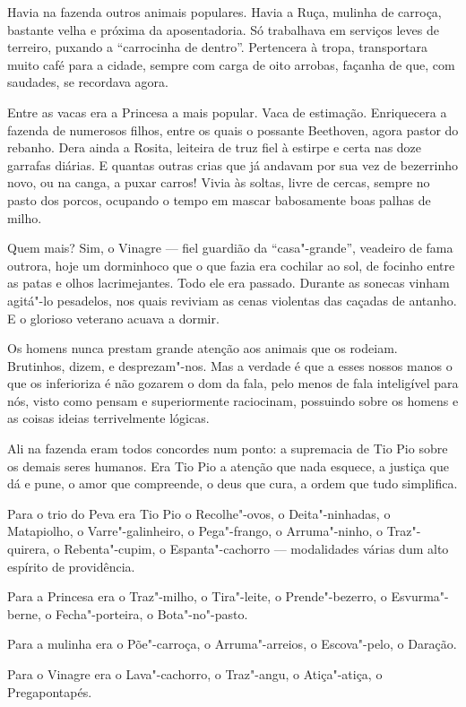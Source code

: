Havia na fazenda outros animais populares. Havia a Ruça, mulinha de
carroça, bastante velha e próxima da aposentadoria. Só trabalhava em
serviços leves de terreiro, puxando a ``carrocinha de dentro''.
Pertencera à tropa, transportara muito café para a cidade, sempre com
carga de oito arrobas, façanha de que, com saudades, se recordava agora.

Entre as vacas era a Princesa a mais popular. Vaca de estimação.
Enriquecera a fazenda de numerosos filhos, entre os quais o possante
Beethoven, agora pastor do rebanho. Dera ainda a Rosita, leiteira de
truz fiel à estirpe e certa nas doze garrafas diárias. E quantas outras
crias que já andavam por sua vez de bezerrinho novo, ou na canga, a
puxar carros! Vivia às soltas, livre de cercas, sempre no pasto dos
porcos, ocupando o tempo em mascar babosamente boas palhas de milho.

Quem mais? Sim, o Vinagre --- fiel guardião da ``casa"-grande'', veadeiro
de fama outrora, hoje um dorminhoco que o que fazia era cochilar ao sol,
de focinho entre as patas e olhos lacrimejantes. Todo ele era passado.
Durante as sonecas vinham agitá"-lo pesadelos, nos quais reviviam as
cenas violentas das caçadas de antanho. E o glorioso veterano acuava a
dormir.

Os homens nunca prestam grande atenção aos animais que os rodeiam.
Brutinhos, dizem, e desprezam"-nos. Mas a verdade é que a esses nossos
manos o que os inferioriza é não gozarem o dom da fala, pelo menos de
fala inteligível para nós, visto como pensam e superiormente raciocinam,
possuindo sobre os homens e as coisas ideias terrivelmente lógicas.

Ali na fazenda eram todos concordes num ponto: a supremacia de Tio Pio
sobre os demais seres humanos. Era Tio Pio a atenção que nada esquece, a
justiça que dá e pune, o amor que compreende, o deus que cura, a ordem
que tudo simplifica.

Para o trio do Peva era Tio Pio o Recolhe"-ovos, o Deita"-ninhadas, o
Matapiolho, o Varre"-galinheiro, o Pega"-frango, o Arruma"-ninho, o
Traz"-quirera, o Rebenta"-cupim, o Espanta"-cachorro --- modalidades várias
dum alto espírito de providência.

Para a Princesa era o Traz"-milho, o Tira"-leite, o Prende"-bezerro, o
Esvurma"-berne, o Fecha"-porteira, o Bota"-no"-pasto.

Para a mulinha era o Põe"-carroça, o Arruma"-arreios, o Escova"-pelo, o
Daração.

Para o Vinagre era o Lava"-cachorro, o Traz"-angu, o Atiça"-atiça, o
Pregapontapés.


